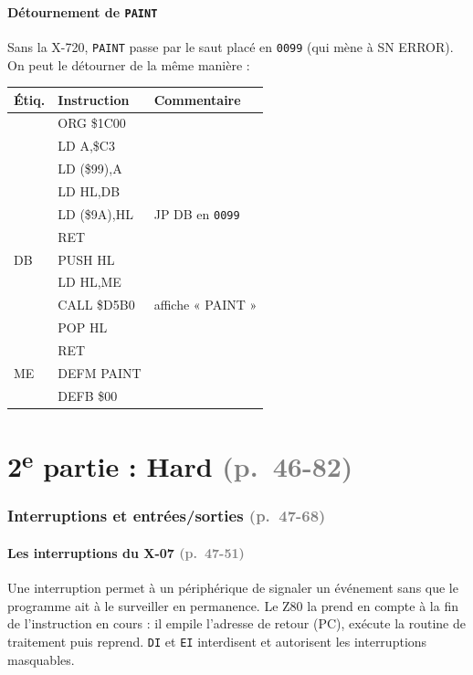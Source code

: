 \documentclass[a4paper,10pt]{article}
\makeatletter
\newcommand{\hex}[1]{\texttt{#1}}
\newcommand{\pg}[1]{\texorpdfstring{\textcolor{gray}{\small(p.~#1)}}{}}
\newenvironment{src}
  {\small\begin{longtable}{@{}>{\ttfamily}l>{\ttfamily}l>{\raggedright\arraybackslash}p{8.6cm}@{}}
   \toprule
   \normalfont\bfseries Étiq. & \normalfont\bfseries Instruction & \textbf{Commentaire}\\
   \midrule\endhead
   \bottomrule\endfoot}
  {\end{longtable}}
\makeatother
\begin{document}
\subsection{Détournement de \texttt{PAINT}}
Sans la X-720, \texttt{PAINT} passe par le saut placé en \hex{0099} (qui
mène à SN ERROR). On peut le détourner de la même manière :
\begin{src}
 & ORG \$1C00 & \\
 & LD A,\$C3 & \\
 & LD (\$99),A & \\
 & LD HL,DB & \\
 & LD (\$9A),HL & JP DB en \hex{0099} \\
 & RET & \\
DB & PUSH HL & \\
 & LD HL,ME & \\
 & CALL \$D5B0 & affiche « PAINT » \\
 & POP HL & \\
 & RET & \\
ME & DEFM PAINT & \\
 & DEFB \$00 & \\
\end{src}

\part*{2\textsuperscript{e} partie : Hard \pg{46-82}}

\section{Interruptions et entrées/sorties \pg{47-68}}

\subsection{Les interruptions du X-07 \pg{47-51}}

Une interruption permet à un périphérique de signaler un événement sans que
le programme ait à le surveiller en permanence. Le Z80 la prend en compte à
la fin de l'instruction en cours : il empile l'adresse de retour (PC),
exécute la routine de traitement puis reprend. \texttt{DI} et \texttt{EI}
interdisent et autorisent les interruptions masquables.
\end{document}
